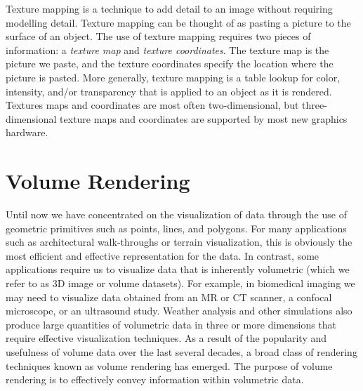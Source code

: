 Texture mapping is a technique to add detail to an image without requiring modelling detail. Texture mapping can be thought of as pasting a picture to the surface of an object. The use of texture mapping requires two pieces of information: a \emph{texture map} and \emph{texture coordinates}. The texture map is the picture we paste, and the texture coordinates specify the location where the picture is pasted. More generally, texture mapping is a table lookup for color, intensity, and/or transparency that is applied to an object as it is rendered. Textures maps and coordinates are most often two-dimensional,
but three-dimensional texture maps and coordinates are supported by most new
graphics hardware.

\section{Volume Rendering}
\label{sec:volume_rendering}

Until now we have concentrated on the visualization of data through the use of geometric primitives such as points, lines, and polygons.
For many applications such as architectural walk-throughs or terrain visualization, this is obviously the most efficient and effective representation for the data.
In contrast, some applications require us to visualize data that is inherently volumetric (which we refer to as 3D image or volume datasets).
For example, in biomedical imaging we may need to visualize data obtained from an MR or CT scanner, a confocal microscope, or an ultrasound study.
Weather analysis and other simulations also produce large quantities of volumetric data in three or more dimensions that require effective visualization techniques.
As a result of the popularity and usefulness of volume data over the last several decades, a broad class of rendering techniques known as volume rendering has emerged. The purpose of volume rendering is to effectively convey information within volumetric data.
